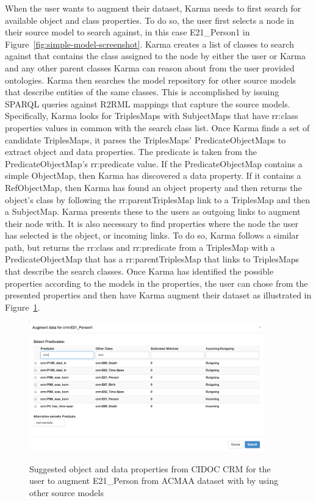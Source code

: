 When the user wants to augment their dataset, Karma needs to first search for available object and class properties.  To do so, the user first selects a node in their source model to search against, in this case E21\_Person1 in Figure~\ref{fig:simple-model-screenshot}.  Karma creates a list of classes to search against that contains the class assigned to the node by either the user or Karma and any other parent classes Karma can reason about from the user provided ontologies.  Karma then searches the model repository for other source models that describe entities of the same classes.  This is accomplished by issuing SPARQL queries against R2RML mappings that capture the source models.  Specifically, Karma looks for TriplesMaps with SubjectMaps that have rr:class properties values in common with the search class list.  Once Karma finds a set of candidate TriplesMaps, it parses the TriplesMaps' PredicateObjectMaps to extract object and data properties.  The predicate is taken from the PredicateObjectMap's rr:predicate value.  If the PredicateObjectMap contains a simple ObjectMap, then Karma has discovered a data property.  If it contains a RefObjectMap, then Karma has found an object property and then returns the object's class by following the rr:parentTriplesMap link to a TriplesMap and then a SubjectMap.  Karma presents these to the users as outgoing links to augment their node with.  It is also necessary to find properties where the node the user has selected is the object, or incoming links.  To do so, Karma follows a similar path, but returns the rr:class and rr:predicate from a TriplesMap with a PredicateObjectMap that has a rr:parentTriplesMap that links to TriplesMaps that describe the search classes. Once Karma has identified the possible properties according to the models in the properties, the user can chose from the presented properties and then have Karma augment their dataset as illustrated in Figure~\ref{fig:search-screenshot}.

\begin{figure}
\begin{center}
\includegraphics[width=4.0in]{5-search.png}
\vspace{-3mm}
\caption{Suggested object and data properties from CIDOC CRM for the user to augment E21\_Person from ACMAA dataset with by using other source models}
\vspace{-2mm}
\label{fig:search-screenshot}
\end{center}
\vspace{-1.5em}
\end{figure}


